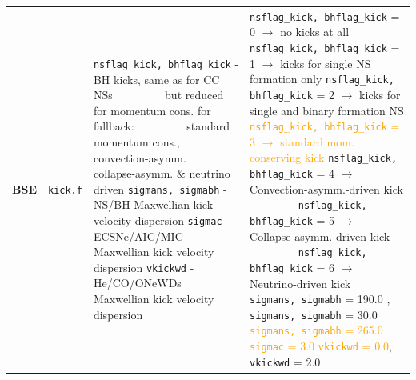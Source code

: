 \begin{landscape}
\begin{table}
\begin{tabular}{|l|l|l|l|}
				\hline \textbf{BSE} & \texttt{kick.f}  & \makecell[l]{\texttt{nsflag\_kick, bhflag\_kick} - BH kicks, same as for CC NSs \\ $\qquad\qquad$ but reduced for momentum cons. for fallback: \\ $\qquad\qquad$ standard momentum cons., convection-asymm. \\ $\qquad\qquad$ collapse-asymm. \& neutrino driven  \\ \texttt{sigmans, sigmabh} - NS/BH Maxwellian kick velocity dispersion \\ \texttt{sigmac} - ECSNe/AIC/MIC Maxwellian kick velocity dispersion \\ \texttt{vkickwd} - He/CO/ONeWDs Maxwellian kick velocity dispersion} &  \makecell[l]{\texttt{nsflag\_kick, bhflag\_kick} = 0 $\rightarrow$ no kicks at all \\ \texttt{nsflag\_kick, bhflag\_kick} = 1 $\rightarrow$ kicks for single NS formation only \\ \texttt{nsflag\_kick, bhflag\_kick} = 2 $\rightarrow$ kicks for single and binary formation NS \\ \textcolor{orange}{\texttt{nsflag\_kick, bhflag\_kick} = 3 $\rightarrow$ standard mom. conserving kick} \cite{Belczynskietal2008} \\ \texttt{nsflag\_kick, bhflag\_kick} = 4 $\rightarrow$ Convection-asymm.-driven kick \\ $\qquad\qquad$ \cite{Schecketal2004,FryerYoung2007, Banerjee2020}\\ \texttt{nsflag\_kick, bhflag\_kick} = 5 $\rightarrow$ Collapse-asymm.-driven kick \\ $\qquad\qquad$ \cite{Fryer2004,MeakinArnett2006,Banerjee2020}\\ \texttt{nsflag\_kick, bhflag\_kick} = 6 $\rightarrow$ Neutrino-driven kick \\ $\qquad\qquad$ \cite{Fulleretal2003,FryerKusenko2006,Banerjee2020}\\ \texttt{sigmans, sigmabh} = 190.0 \cite{HansenPhinney1997}, \texttt{sigmans, sigmabh} = 30.0 \cite{Wang2016} \\ \textcolor{orange}{\texttt{sigmans, sigmabh} = 265.0} \cite{Hobbsetal2005} \\ \textcolor{orange}{\texttt{sigmac} = 3.0} \cite{GessnerJanka2018} \\ \textcolor{orange}{\texttt{vkickwd} = 0.0}, \quad \texttt{vkickwd} = 2.0 \cite{Fellhaueretal2003}} \\

\end{tabular}
\end{table}
\end{landscape}
